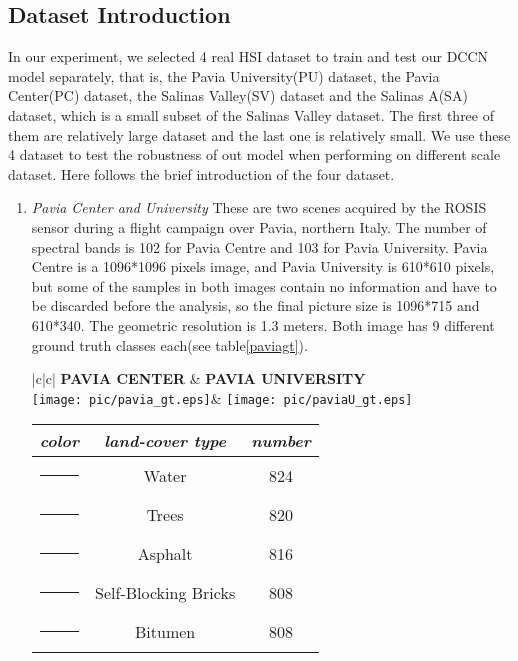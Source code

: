 \documentclass{article}
\newcommand\crule[3][black]{\textcolor{#1}{\rule{#2}{#3}}}
\begin{document}
	\subsection{Dataset Introduction}\label{subsec:dataset-introduction}
	In our experiment, we selected 4 real HSI dataset to train and test our DCCN model separately, that is, the
	Pavia University(PU) dataset, the Pavia Center(PC) dataset, the Salinas Valley(SV) dataset and the Salinas A(SA)
	dataset, which is a small subset of the Salinas Valley dataset.
	The first three of them are relatively large dataset and the last one is relatively small.
	We use these 4 dataset to test the robustness of out model when performing on different scale dataset.
	Here follows the brief introduction of the four dataset.
	\begin{enumerate}[1)]
		\item \textit{Pavia Center and University} These are two scenes acquired by the ROSIS sensor during a flight
		campaign over Pavia, northern Italy.
		The number of spectral bands is 102 for Pavia Centre and 103 for Pavia University.
		Pavia Centre is a 1096*1096 pixels image, and Pavia University is 610*610 pixels, but some of the samples in
		both images contain no information and have to be discarded before the analysis, so the final picture size is
		1096*715 and 610*340.
		The geometric resolution is 1.3 meters.
		Both image has 9 different ground truth classes each(see table\ref{paviagt}).
		\begin{table}[h]
			\centering
			\begin{tabular}{|c|c|}
				\hline
				\textbf{PAVIA CENTER}    & \textbf{PAVIA UNIVERSITY}\\
				\hline
				\texttt{[image: pic/pavia\_gt.eps]}&
				\texttt{[image: pic/paviaU\_gt.eps]}\\
				\hline
				\begin{tabular}{ccc}
					\footnotesize
					\textit{color}&\textit{land-cover type}&\textit{number}\\
					\hline
					\crule[pavia1]{0.02\textwidth}{0.02\textwidth} &Water &824    \\
					\crule[pavia2]{0.02\textwidth}{0.02\textwidth} &Trees &820    \\
					\crule[pavia3]{0.02\textwidth}{0.02\textwidth} &Asphalt &816    \\
					\crule[pavia4]{0.02\textwidth}{0.02\textwidth} &Self-Blocking Bricks &808    \\
					\crule[pavia5]{0.02\textwidth}{0.02\textwidth} &Bitumen &808    \\

\end{tabular}
\end{tabular}
\end{table}
\end{enumerate}
\end{document}
